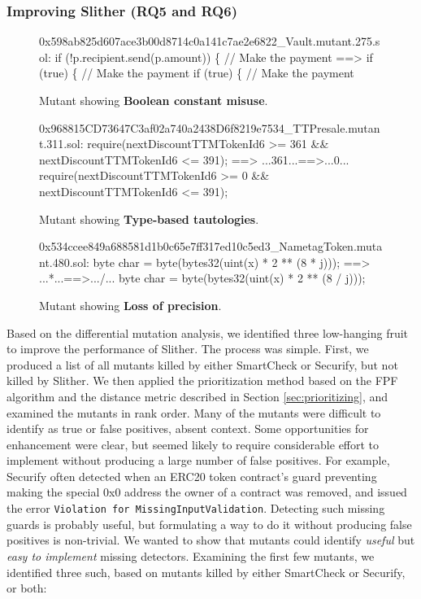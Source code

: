 \subsubsection{Improving Slither {\bf (RQ5 and RQ6)}}


\begin{figure}
  {\scriptsize
\noindent \begin{code}
 0x598ab825d607ace3b00d8714c0a141c7ae2e6822\_Vault.mutant.275.sol:
 if (!p.recipient.send(p.amount)) \{  // Make the payment
 ==>          if (true) \{  // Make the payment
 if (true) \{  // Make the payment
      \end{code}
      }
      \caption{Mutant showing {\bf Boolean constant misuse}.}
      \label{fig:boolean}
    \end{figure}

    \begin{figure}
      {\scriptsize
\begin{code}
 0x968815CD73647C3af02a740a2438D6f8219e7534\_TTPresale.mutant.311.sol:
 require(nextDiscountTTMTokenId6 >= 361 \&\& nextDiscountTTMTokenId6 <= 391);
 ==>  ...361...==>...0...
 require(nextDiscountTTMTokenId6 >= 0 \&\& nextDiscountTTMTokenId6 <= 391);
      \end{code}
      }
      \caption{Mutant showing {\bf Type-based tautologies}.}
      \label{fig:tautology}      
\end{figure}

\begin{figure}
  {\scriptsize
\begin{code}
 0x534ccee849a688581d1b0c65e7ff317ed10c5ed3\_NametagToken.mutant.480.sol:
 byte char = byte(bytes32(uint(x) * 2 ** (8 * j)));
 ==>  ...*...==>.../...
 byte char = byte(bytes32(uint(x) * 2 ** (8 / j)));
      \end{code}
      }
      \caption{Mutant showing {\bf Loss of precision}.}
      \label{fig:divmul}            
      \end{figure}


Based on the differential mutation analysis, we identified three low-hanging fruit to improve the performance of Slither.  The process was simple.  First, we produced a list of all mutants killed by either SmartCheck or Securify, but not killed by Slither.  We then applied the prioritization method based on the FPF algorithm and the distance metric described in Section \ref{sec:prioritizing}, and examined the mutants in rank order.  Many of the mutants were difficult to identify as true or false positives, absent context.  Some opportunities for enhancement were clear, but seemed likely to require considerable effort to implement without producing a large number of false positives.  For example, Securify often detected when an ERC20 token contract's guard preventing making the special 0x0 address the owner of a contract was removed, and issued the error {\tt Violation for MissingInputValidation}. Detecting such missing guards is probably useful, but formulating a way to do it without producing false positives is non-trivial.  We wanted to show that mutants could identify \emph{useful} but \emph{easy to implement} missing detectors.  Examining the first few mutants, we identified three such, based on mutants killed by either SmartCheck or Securify, or both:

